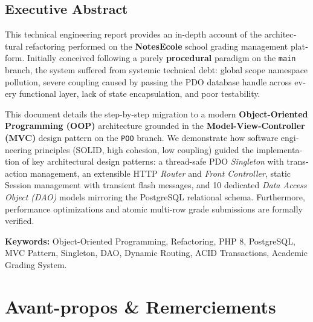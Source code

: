 \documentclass[11pt,a4paper,oneside]{report}
\begin{document}
\vspace{1.5cm}

\begin{otherlanguage}{english}
\chapter*{Executive Abstract}

This technical engineering report provides an in-depth account of the architectural refactoring performed on the \textbf{NotesEcole} school grading management platform. Initially conceived following a purely \textbf{procedural} paradigm on the \texttt{main} branch, the system suffered from systemic technical debt: global scope namespace pollution, severe coupling caused by passing the PDO database handle across every functional layer, lack of state encapsulation, and poor testability.

This document details the step-by-step migration to a modern \textbf{Object-Oriented Programming (OOP)} architecture grounded in the \textbf{Model-View-Controller (MVC)} design pattern on the \texttt{POO} branch. We demonstrate how software engineering principles (SOLID, high cohesion, low coupling) guided the implementation of key architectural design patterns: a thread-safe PDO \textit{Singleton} with transaction management, an extensible HTTP \textit{Router} and \textit{Front Controller}, static Session management with transient flash messages, and 10 dedicated \textit{Data Access Object (DAO)} models mirroring the PostgreSQL relational schema. Furthermore, performance optimizations and atomic multi-row grade submissions are formally verified.

\vspace{0.8cm}

\noindent \textbf{Keywords:} Object-Oriented Programming, Refactoring, PHP 8, PostgreSQL, MVC Pattern, Singleton, DAO, Dynamic Routing, ACID Transactions, Academic Grading System.
\end{otherlanguage}

\chapter*{Avant-propos \& Remerciements}
\end{document}

